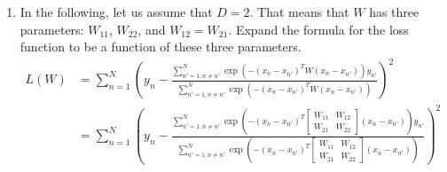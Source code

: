 \documentclass[submit]{harvardml}
\begin{document}
\begin{problem}
\begin{enumerate}
\item In the following, let us assume that $D = 2$.  That means that
  $W$ has three parameters: $W_{11}$, $W_{22}$, and $W_{12} = W_{21}$.
  Expand the formula for the loss function to be a function of these
  three parameters.
    \begin{equation*}
    \begin{split}
        L(W) & = \sum_{n=1}^{N}\left(y_n-\frac{\sum_{n'=1,n\neq n'}^{N}\exp(-(x_n-x_{n'})^T W (x_n-x_{n'}) )y_{n'}}{\sum_{n'=1,n\neq n'}^{N}\exp(-(x_n-x_{n'})^T W (x_n-x_{n'}) )}\right)^2 \\
        & = \sum_{n=1}^{N}\left(y_n-\frac{\sum_{n'=1,n\neq n'}^{N}\exp(-(x_n-x_{n'})^T \begin{bmatrix}
        W_{11} & W_{12} \\  
        W_{21} & W_{22} 
        \end{bmatrix}(x_n-x_{n'}) )y_{n'}}{\sum_{n'=1,n\neq n'}^{N}\exp(-(x_n-x_{n'})^T \begin{bmatrix}
        W_{11} & W_{12} \\  
        W_{21} & W_{22} 
        \end{bmatrix}
        (x_n-x_{n'}) )}\right)^2
    \end{split}
    \end{equation*}
\end{enumerate}
\end{problem}
\newpage
\end{document}
